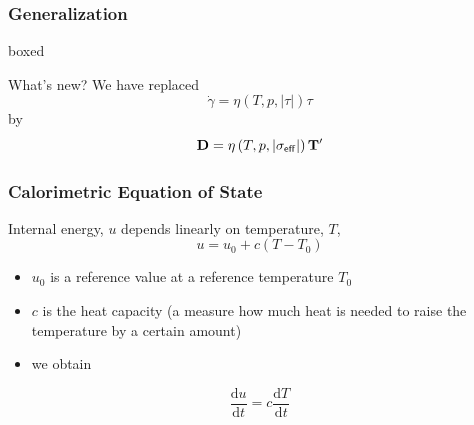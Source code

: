 \documentclass[hide notes,intlimits]{beamer}
\begin{document}
\begin{frame}
  \frametitle{Generalization}
   \begin{beamercolorbox}[rounded=true,shadow=true]{boxed}
     \begin{block}{What's new?}
       \vspace{1em}
       We have replaced
       \begin{equation}
         \dot \gamma = \eta\left(T,p,\vert \tau \vert\right)\tau
       \end{equation}
       by
       \begin{equation}
         \mathbf{D} = \eta\left(T,p,\vert \sigma_{\sf{eff}} \vert\right)\mathbf{T}'
       \end{equation}  
     \end{block}
   \end{beamercolorbox}
 \end{frame}


\begin{frame}
  \frametitle{Calorimetric Equation of State}
  Internal energy, $u$ depends linearly on temperature, $T$,
  \begin{equation}
    u = u_{0} + c\left(T-T_{0}\right)
  \end{equation}
  \begin{itemize}
  \item $u_{0}$ is a reference value at a reference temperature $T_{0}$
  \item $c$ is the heat capacity (a measure how much heat is needed to raise the temperature by a certain amount)
  \item we obtain
  \end{itemize}
  \begin{equation}
    \frac{\text{d} u}{\text{d} t} =     c \frac{\text{d} T}{\text{d} t} 
  \end{equation}
\end{frame}
\end{document}
